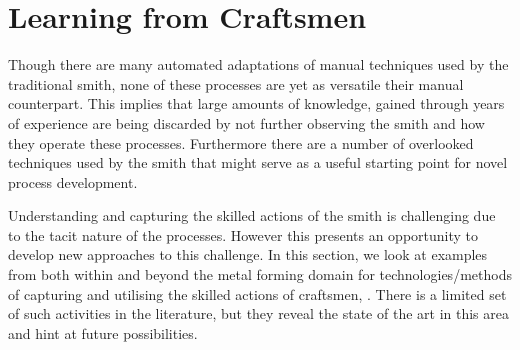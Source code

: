 





\newpage
\section{Learning from Craftsmen} \label{sec:Learning}

Though there are many automated adaptations of manual techniques used by the traditional smith, none of these processes are yet as versatile their manual counterpart. This implies that large amounts of knowledge, gained through years of experience are being discarded by not further observing the smith and how they operate these processes. Furthermore there are a number of overlooked techniques used by the smith that might serve as a useful starting point for novel process development. 

Understanding and capturing the skilled actions of the smith is challenging due to the tacit nature of the processes. However this presents an opportunity to develop new approaches to this challenge. In this section, we look at examples from both within and beyond the metal forming domain for technologies/methods of capturing and utilising the skilled actions of craftsmen, . There is a limited set of such activities in the literature, but they reveal the state of the art in this area and hint at future possibilities. 

